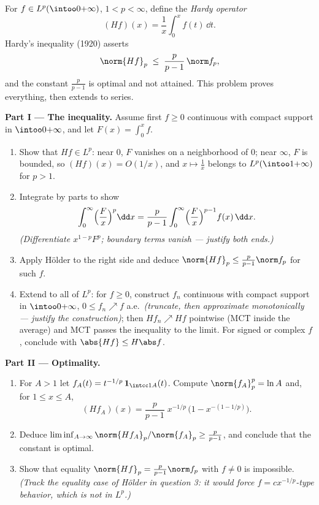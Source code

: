 \begin{problem}\label{pb:b3:lp:1}
For $f \in L^p(\intoo0{+\infty})$, $1 < p < \infty$, define
the \emph{Hardy operator}
\[
(Hf)(x) = \frac1x\int_0^x f(t)\,\dd t .
\]
Hardy's inequality (1920) asserts
\[
\norm{Hf}_p \;\leq\; \frac{p}{p-1}\,\norm f_p ,
\]
and the constant $\frac p{p-1}$ is optimal and not attained.
This problem proves everything, then extends to series.

\medskip
\noindent\textbf{Part I --- The inequality.} Assume first $f
\geq 0$ continuous with compact support in
$\intoo0{+\infty}$, and let $F(x) = \int_0^xf$.
\begin{enumerate}
  \item Show that $Hf \in L^p$: near $0$, $F$ vanishes on a
        neighborhood of $0$; near $\infty$, $F$ is bounded, so
        $(Hf)(x) = O(1/x)$, and $x \mapsto \frac1x$ belongs to
        $L^p(\intoo1{+\infty})$ for $p > 1$.
  \item Integrate by parts to show
        \[
        \int_0^\infty \Bigl(\frac Fx\Bigr)^p\dd x
        = \frac{p}{p-1}\int_0^\infty\Bigl(\frac
        Fx\Bigr)^{p-1}f(x)\,\dd x .
        \]
        \emph{(Differentiate $x^{1-p}F^p$; boundary terms
        vanish --- justify both ends.)}
  \item Apply H\"older to the right side and deduce
        $\norm{Hf}_p \leq \frac p{p-1}\norm f_p$ for such $f$.
  \item Extend to all of $L^p$: for $f \geq 0$, construct
        $f_n$ continuous with compact support in
        $\intoo0{+\infty}$, $0 \leq f_n \nearrow f$ a.e.\
        \emph{(truncate, then approximate monotonically ---
        justify the construction)}; then $Hf_n \nearrow Hf$
        pointwise (MCT inside the average) and MCT passes the
        inequality to the limit. For signed or complex $f$,
        conclude with $\abs{Hf} \leq H\abs f$.
\end{enumerate}

\medskip
\noindent\textbf{Part II --- Optimality.}
\begin{enumerate}[resume]
  \item For $A > 1$ let $f_A(t) = t^{-1/p}\,\mathbf
        1_{\intcc1A}(t)$. Compute $\norm{f_A}_p^p = \ln A$
        and, for $1 \leq x \leq A$,
        \[
        (Hf_A)(x) = \frac p{p-1}\;x^{-1/p}\,
        \bigl(1 - x^{-(1 - 1/p)}\bigr).
        \]
  \item Deduce $\liminf_{A\to\infty} \norm{Hf_A}_p/
        \norm{f_A}_p \geq \frac{p}{p-1}$, and conclude that
        the constant is optimal.
  \item Show that equality $\norm{Hf}_p = \frac
        p{p-1}\norm f_p$ with $f \neq 0$ is impossible.
        \emph{(Track the equality case of H\"older in question
        3: it would force $f = cx^{-1/p}$-type behavior, which
        is not in $L^p$.)}
\end{enumerate}


\end{problem}
